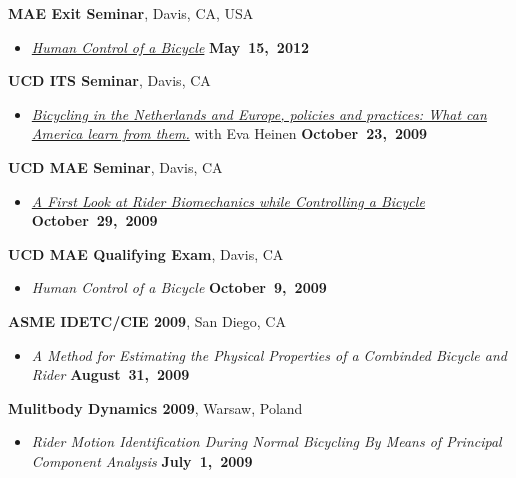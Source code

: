 \documentclass[10pt]{article}
\newenvironment{outerlist}[1][\enskip\textbullet]%
        {\begin{itemize}[#1]}{\end{itemize}%
         \vspace{-.6\baselineskip}}
\newcommand{\blankline}{\quad\pagebreak[2]}
\begin{document}
\blankline

\textbf{MAE Exit Seminar}, Davis, CA, USA
\begin{outerlist}
  \item[] \textit{\href{http://youtu.be/oKbaHCGK94E}{Human Control of a
    Bicycle}}
  \hfill \textbf{May~15,~2012}
\end{outerlist}

\blankline

\textbf{UCD ITS Seminar}, Davis, CA
\begin{outerlist}
\item[]
  \textit{\href{http://www.its.ucdavis.edu/?seminar=october-23-2009}{Bicycling
    in the Netherlands and Europe, policies and practices: What can America
    learn from them.}} with Eva Heinen
    \hfill \textbf{October~23,~2009}
\end{outerlist}

\blankline

\textbf{UCD MAE Seminar}, Davis, CA
\begin{outerlist}
  \item[]
    \textit{\href{http://archive.org/details/AFirstLookAtRiderBiomechanicsWhileControllingABicycle}{A
      First Look at Rider Biomechanics while Controlling a Bicycle}}
    \hfill \textbf{October~29,~2009}
\end{outerlist}

\blankline

\textbf{UCD MAE Qualifying Exam}, Davis, CA
\begin{outerlist}
  \item[] \textit{Human Control of a Bicycle}
    \hfill \textbf{October~9,~2009}
\end{outerlist}

\blankline

\textbf{ASME IDETC/CIE 2009}, San Diego, CA
\begin{outerlist}
  \item[] \textit{A Method for Estimating the Physical Properties of a Combinded Bicycle and
Rider}
    \hfill \textbf{August~31,~2009}
\end{outerlist}

\blankline

\textbf{Mulitbody Dynamics 2009}, Warsaw, Poland
\begin{outerlist}
  \item[] \textit{Rider Motion Identification During Normal Bicycling By Means of Principal
Component Analysis}
    \hfill \textbf{July~1,~2009}
\end{outerlist}
\end{document}
